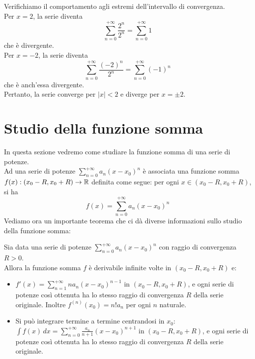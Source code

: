   Verifichiamo il comportamento agli estremi dell'intervallo di convergenza.\\
  Per $x = 2$, la serie diventa
  \[
      \sum_{n=0}^{+\infty} \frac{2^n}{2^n} = \sum_{n=0}^{+\infty} 1
  \]
  che è divergente.\\
  Per $x = -2$, la serie diventa
  \[
      \sum_{n=0}^{+\infty} \frac{(-2)^n}{2^n} = \sum_{n=0}^{+\infty} (-1)^n
  \]
  che è anch'essa divergente.\\
  Pertanto, la serie converge per $\lvert x \rvert < 2$ e diverge per $x = \pm 2$.\\

  \section{Studio della funzione somma}
  In questa sezione vedremo come studiare la funzione somma di una serie di potenze.\\
  Ad una serie di potenze $\sum_{n=0}^{+\infty} a_n (x-x_0)^n$ è associata una funzione somma $f(x): (x_0-R,x_0+R) \to \mathbb{R}$ definita come segue: per ogni $x \in (x_0-R,x_0+R)$, si ha
  \[
      f(x) = \sum_{n=0}^{+\infty} a_n (x-x_0)^n
  \]
  Vediamo ora un importante teorema che ci dà diverse informazioni sullo studio della funzione somma:

  \begin{teorema}{}
    Sia data una serie di potenze $\sum_{n=0}^{+\infty} a_n (x-x_0)^n$ con raggio di convergenza $R>0$.\\
    Allora la funzione somma $f$ è derivabile infinite volte in $(x_0-R,x_0+R)$ e:
    \begin{itemize}
    \item $f'(x) = \sum_{n=1}^{+\infty} n a_n (x-x_0)^{n-1}$ in $(x_0-R,x_0+R)$, e ogni serie di potenze così ottenuta ha lo stesso raggio di convergenza $R$ della serie originale. Inoltre $f^{(n)}(x_0)=n!a_n$ per ogni $n$ naturale.
    \item Si può integrare termine a termine centrandosi in $x_0$: $\int f(x) \, dx = \sum_{n=0}^{+\infty} \frac{a_n}{n+1} (x-x_0)^{n+1}$ in $(x_0-R,x_0+R)$, e ogni serie di potenze così ottenuta ha lo stesso raggio di convergenza $R$ della serie originale.
    \end{itemize}
  \end{teorema}



